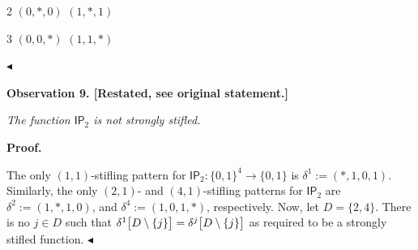 \documentclass[10pt,a4paper]{article}
\begin{document}
2
$(0,*,0)$
$(1,*,1)$


3
$(0,0,*)$
$(1,1,*)$









$\blacktriangleleft$\par






\par\medskip\noindent\textbf{
\textbf{Observation 9}\textbf{.}
[Restated, see original statement.]}\par



\emph{The function $\mathsf{IP}_{2}$ is not strongly stifled.}\par








\par\medskip\noindent\textbf{Proof.}\par




The only $(1,1)$-stifling pattern for $\mathsf{IP}_{2}:\{0,1\}^{4}\to\{0,1\}$ is $\delta^{1}:=(*,1,0,1)$.
Similarly, the only $(2,1)$- and $(4,1)$-stifling patterns for $\mathsf{IP}_{2}$ are $\delta^{2}:=(1,*,1,0)$, and $\delta^{4}:=(1,0,1,*)$, respectively.
Now, let $D=\{2,4\}$.
There is no $j\in D$ such that $\delta^{1}\bigl{[}D\setminus\{j\}\bigr{]}=\delta^{j}\bigl{[}D\setminus\{j\}%
\bigr{]}$ as required to be a strongly stifled function.
$\blacktriangleleft$\par




\par
\end{document}
